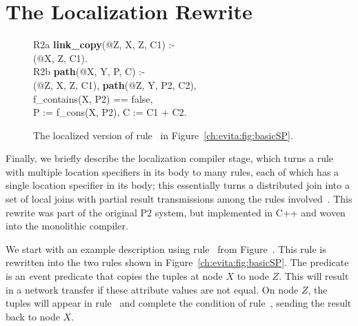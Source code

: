 \section{The Localization Rewrite}
\label{ch:evita:sec:local}

\begin{figure}[!t]
\ssp
\centering
\begin{boxedminipage}{\linewidth}
R2a {\bf link\_copy}(@Z, X, Z, C1) :- \\
(@X, Z, C1). \\

R2b {\bf path}(@X, Y, P, C) :- \\
(@Z, X, Z, C1), {\bf path}(@Z, Y, P2, C2),\\
\datalogspace f\_contains(X, P2) == false, \\
\datalogspace P := f\_cons(X, P2), C := C1 + C2. \\

\end{boxedminipage}
\caption{\label{ch:evita:fig:basicSPLocal}The localized version of rule~ in
Figure~\ref{ch:evita:fig:basicSP}.}
\end{figure}

Finally, we briefly describe the localization compiler stage, which turns a
rule with multiple location specifiers in its body to many rules, each of which
has a single location specifier in its body; this essentially turns a
distributed join into a set of local joins with partial result transmissions
among the rules involved~\cite{loo-sigmod06}.  This rewrite was part of the
original P2 system, but implemented in C++ and woven into the monolithic
compiler. 

We start with an example description using rule~ from
Figure~.  This rule is rewritten into the two rules shown
in Figure~\ref{ch:evita:fig:basicSP}.  The  predicate is an
{\emph event} predicate that copies the  tuples at node $X$ to node
$Z$.  This will result in a network transfer if these attribute values are not
equal.  On node $Z$, the  tuples will appear in rule~
and complete the condition of rule~, sending the result back to node
$X$.

